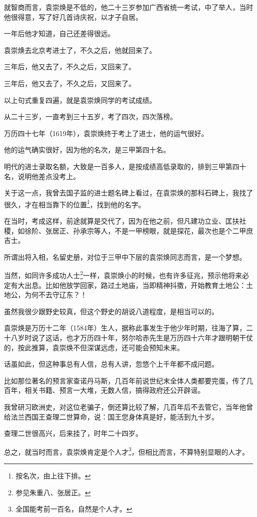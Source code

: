 \begin{multicols}{\theparacolNo}
就智商而言，袁崇焕是不低的，他二十三岁参加广西省统一考试，中了举人，当时他很得意，写了好几首诗庆祝，以才子自居。

一年后他才知道，自己还差得很远。

袁崇焕去北京考进士了，不久之后，他就回来了。

三年后，他又去了，不久之后，又回来了。

三年后，他又去了，不久之后，又回来了。

以上句式重复四遍，就是袁崇焕同学的考试成绩。

从二十三岁，一直考到三十五岁，考了四次，四次落榜。

万历四十七年（1619年），袁崇焕终于考上了进士，他的运气很好。

他的运气确实很好，因为他的名次，是三甲第四十名。

明代的进士录取名额，大致是一百多人，是按成绩高低录取的，排到三甲第四十名，说明他差点没考上。

关于这一点，我曾去国子监的进士题名碑上看过，在袁崇焕的那科石碑上，我找了很久，才在相当靠下的位置\footnote{按名次，由上往下排。}，找到他的名字。

在当时，考成这样，前途就算是交代了，因为在他之前，但凡建功立业、匡扶社稷，如徐阶、张居正、孙承宗等人，不是一甲榜眼，就是探花，最次也是个二甲庶吉士。

所谓出将入相，名留史册，对位于三甲中下层的袁崇焕同志而言，是一个梦想。

当然，如同许多成功人士\footnote{参见朱重八、张居正。}一样，袁崇焕小的时候，也有许多征兆，预示他将来必定有大出息。比如他放学回家，路过土地庙，当即精神抖擞，开始教育土地公：土地公，为何不去守辽东？！

虽然我很少跟野史较真，但这个野史的胡说八道程度，是相当可以的。

袁崇焕是万历十二年（1584年）生人，据称此事发生于他少年时期，往海了算，二十八岁时说了这话，也才万历四十年，努尔哈赤先生是万历四十六年才跟明朝干仗的，按此推算，袁崇焕不但深谋远虑，还可能会预知未来。

话虽如此，但这种事总有人信，总有人讲，忽悠个上千年都不成问题。

比如那位著名的预言家查诺丹马斯，几百年前说世纪末全体人类都要完蛋，传了几百年，相关书籍、预言一大堆，无数人信，搞得政府还公开辟谣。

我曾研习欧洲史，对这位老骗子，倒还算比较了解，几百年后不去管它，当年他曾给法兰西国王查理二世算命，说：国王您身体真是好，能活到九十岁。

查理二世很高兴，后来挂了，时年二十四岁。

总之，就当时而言，袁崇焕肯定是个人才\footnote{全国能考前一百名，自然是个人才。}，但相比而言，不算特别显眼的人才。


\end{multicols}
